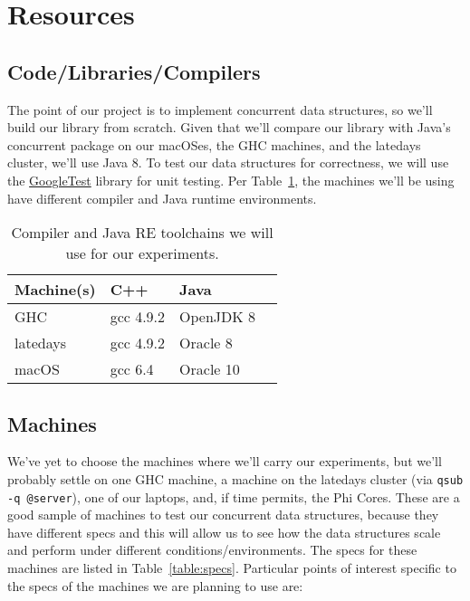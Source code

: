 \documentclass[11pt]{article}
\begin{document}
\section*{Resources}

\subsection*{Code/Libraries/Compilers}
The point of our project is to implement concurrent data structures, so we'll
build our library from scratch. Given that we'll compare our library with Java's
concurrent package on our macOSes, the GHC machines, and the latedays cluster,
we'll use Java 8. To test our data structures for correctness, we will use the
\href{https://github.com/google/googletest}{GoogleTest} library for unit testing.
Per Table~\ref{table:compiler}, the machines we'll be using have different
compiler and Java runtime environments.

\begin{table}[t]
\begin{center}
\begin{tabular}{llll}
\toprule
\bf Machine(s) & \bf C++ & \bf Java \\
\midrule
GHC            & gcc 4.9.2 & OpenJDK 8 \\
latedays       & gcc 4.9.2 & Oracle 8 \\
macOS          & gcc 6.4 & Oracle 10 \\
\bottomrule
\end{tabular}
\caption{Compiler and Java RE toolchains we will use for our experiments.}
\label{table:compiler}
\end{center}
\end{table}

\subsection*{Machines}
We've yet to choose the machines where we'll carry our experiments, but we'll
probably settle on one GHC machine, a machine on the latedays cluster (via
\texttt{qsub -q @server}), one of our laptops, and, if time permits, the Phi
Cores. These are a good sample of machines to test our concurrent data
structures, because they have different specs and this will allow us to see how
the data structures scale and perform under different conditions/environments.
The specs for these machines are listed in Table~\ref{table:specs}. Particular
points of interest specific to the specs of the machines we are planning to use
are:
\end{document}
